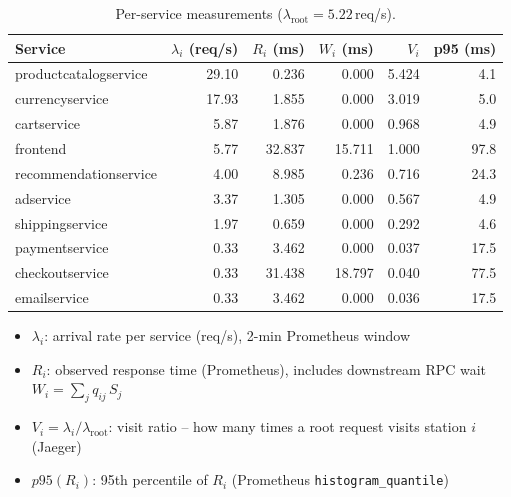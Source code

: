 \documentclass[12pt]{article}
\begin{document}
\begin{table}[H]
  \centering
  \small
  \setlength{\tabcolsep}{5pt}
  \begin{tabular}{l|r|r|r|r|r}
    \toprule
    Service & $\lambda_i$ (req/s) & $R_i$ (ms) & $W_i$ (ms) & $V_i$ & p95 (ms) \\
    \midrule
    productcatalogservice & 29.10 &  0.236 &  0.000 & 5.424 &   4.1 \\
    currencyservice       & 17.93 &  1.855 &  0.000 & 3.019 &   5.0 \\
    cartservice           &  5.87 &  1.876 &  0.000 & 0.968 &   4.9 \\
    frontend              &  5.77 & 32.837 & 15.711 & 1.000 &  97.8 \\
    recommendationservice &  4.00 &  8.985 &  0.236 & 0.716 &  24.3 \\
    adservice             &  3.37 &  1.305 &  0.000 & 0.567 &   4.9 \\
    shippingservice       &  1.97 &  0.659 &  0.000 & 0.292 &   4.6 \\
    paymentservice        &  0.33 &  3.462 &  0.000 & 0.037 &  17.5 \\
    checkoutservice       &  0.33 & 31.438 & 18.797 & 0.040 &  77.5 \\
    emailservice          &  0.33 &  3.462 &  0.000 & 0.036 &  17.5 \\
    \bottomrule
  \end{tabular}
  \caption[Per-service measurements]{Per-service measurements ($\lambda_{\text{root}}{=}5.22$\,req/s).}
  \label{tab:baseline-per-service}
  \vspace{0.5ex}
  \begin{minipage}{\linewidth}
    \footnotesize
    \begin{itemize}
      \item $\lambda_i$: arrival rate per service (req/s), 2-min Prometheus window
      \item $R_i$: observed response time (Prometheus), includes downstream RPC wait $W_i = \sum_j q_{ij}\,S_j$
      \item $V_i = \lambda_i / \lambda_{\text{root}}$: visit ratio -- how many times a root request visits station $i$ (Jaeger)
      \item $p95(R_i)$: 95th percentile of $R_i$ (Prometheus \texttt{histogram\_quantile})
    \end{itemize}
  \end{minipage}
\end{table}
\end{document}
